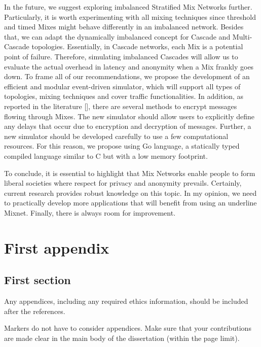 \documentclass[logo,msc,cyber]{infthesis}   %
\begin{document}
In the future, we suggest exploring imbalanced Stratified Mix Networks further.
Particularly, it is worth experimenting with all mixing techniques since
threshold and timed Mixes might behave differently in an imbalanced network.
Besides that, we can adapt the dynamically imbalanced concept for Cascade and
Multi-Cascade topologies. Essentially, in Cascade networks, each Mix is a
potential point of failure. Therefore,  simulating imbalanced Cascades will
allow us to evaluate the actual overhead in latency and anonymity when a Mix
frankly goes down. To frame all of our recommendations, we propose
the development of an efficient and modular event-driven simulator, which will
support all types of topologies, mixing techniques and cover traffic
functionalities. In addition, as reported in the literature [], there are
several methods to encrypt messages flowing through Mixes. The new simulator
should allow users to explicitly define any delays that occur due to encryption
and decryption of messages. Further, a new simulator should be developed
carefully to use a few computational resources. For this reason, we propose
using Go language, a statically typed compiled language similar to C but with a
low memory footprint.

To conclude, it is essential to highlight that Mix Networks enable people to form
liberal societies where respect for privacy and anonymity prevails. Certainly,
current research provides robust knowledge on this topic. In my opinion, we need
to practically develop more applications that will benefit from using an
underline Mixnet. Finally, there is always room for improvement.





\appendix

\chapter{First appendix}

\section{First section}

Any appendices, including any required ethics information, should be included
after the references.

Markers do not have to consider appendices. Make sure that your contributions
are made clear in the main body of the dissertation (within the page limit).
\end{document}
